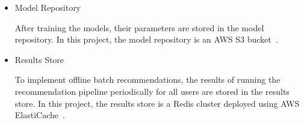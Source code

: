 \begin{itemize}
    \item Model Repository
    \begin{displayquote}
        After training the models, their parameters are stored in the model repository. In this project, the model repository is an AWS S3 bucket~\cite{AwsS3}. 
    \end{displayquote}
    \item Results Store
    \begin{displayquote}
       To implement offline batch recommendations, the results of running the recommendation pipeline periodically for all users are stored in the results store. 
       In this project, the results store is a Redis\cite{Redis} cluster deployed using AWS ElastiCache~\cite{AwsElastiCache}.
    \end{displayquote}
\end{itemize}

